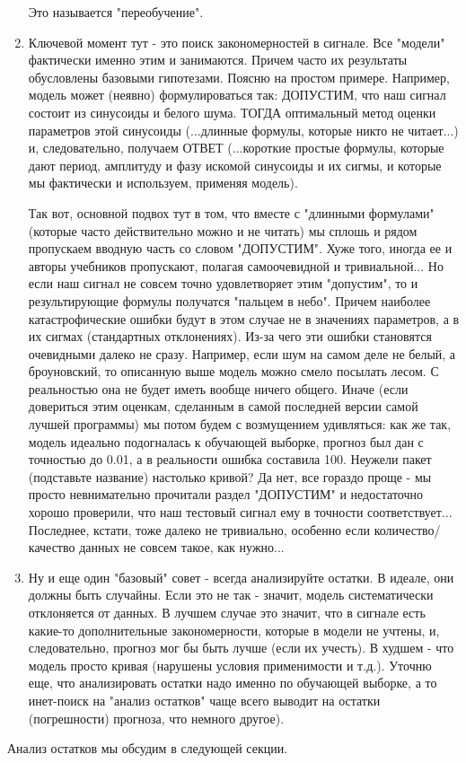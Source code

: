 \begin{enumerate}
      Это называется "переобучение".
    \item Ключевой момент тут - это поиск закономерностей в сигнале. Все
      "модели" фактически именно этим и занимаются. Причем часто их
      результаты обусловлены базовыми гипотезами. Поясню на простом
      примере. Например, модель может (неявно) формулироваться так:
      ДОПУСТИМ, что наш сигнал состоит из синусоиды и белого шума.
      ТОГДА оптимальный метод оценки параметров этой синусоиды (...длинные
      формулы, которые никто не читает...) и, следовательно, получаем
      ОТВЕТ (...короткие простые формулы, которые дают период, амплитуду и
        фазу искомой синусоиды и их сигмы, и которые мы фактически и
      используем, применяя модель).

      Так вот, основной подвох тут в том, что вместе с "длинными формулами"
      (которые часто действительно можно и не читать) мы сплошь и рядом
      пропускаем вводную часть со словом "ДОПУСТИМ". Хуже того, иногда ее и
      авторы учебников пропускают, полагая самоочевидной и тривиальной...
      Но если наш сигнал не совсем точно удовлетворяет этим "допустим", то
      и результирующие формулы получатся "пальцем в небо". Причем наиболее
      катастрофические ошибки будут в этом случае не в значениях
      параметров, а в их сигмах (стандартных отклонениях). Из-за чего эти
      ошибки становятся очевидными далеко не сразу. Например, если шум на
      самом деле не белый, а броуновский, то описанную выше модель можно
      смело посылать лесом. С реальностью она не будет иметь вообще ничего
      общего. Иначе (если довериться этим оценкам, сделанным в самой
      последней версии самой лучшей программы) мы потом будем с возмущением
      удивляться: как же так, модель идеально подогналась к обучающей
      выборке, прогноз был дан с точностью до 0.01, а в реальности ошибка
      составила 100. Неужели пакет (подставьте название) настолько кривой?
      Да нет, все гораздо проще - мы просто невнимательно прочитали раздел
      "ДОПУСТИМ" и недостаточно хорошо проверили, что наш тестовый сигнал
      ему в точности соответствует... Последнее, кстати, тоже далеко не
      тривиально, особенно если количество/качество данных не совсем такое,
      как нужно...
    \item Ну и еще один "базовый" совет - всегда анализируйте остатки. В
      идеале, они должны быть случайны. Если это не так - значит, модель
      систематически отклоняется от данных. В лучшем случае это значит, что
      в сигнале есть какие-то дополнительные закономерности, которые в
      модели не учтены, и, следовательно, прогноз мог бы быть лучше (если
      их учесть). В худшем - что модель просто кривая (нарушены условия
      применимости и т.д.). Уточню еще, что анализировать остатки надо
      именно по обучающей выборке, а то инет-поиск на "анализ остатков"
    чаще всего выводит на остатки (погрешности) прогноза, что немного другое).
\end{enumerate}

Анализ остатков мы обсудим в следующей секции.

\printbibliography[heading=subbibliography, title={Источники}]